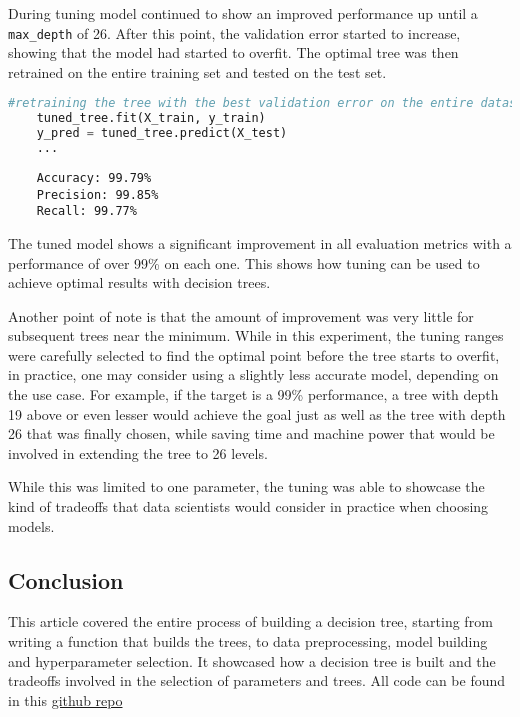 \documentclass{article}
\begin{document}
During tuning model continued to show an improved performance up until a \texttt{max\_depth} of 26. After this point, the validation error started to increase, showing that the model had started to overfit. The optimal tree was then retrained on the entire training set and tested on the test set.
\begin{lstlisting}[language=Python, caption=Retraining the best tree, label=code:hyperparameter_tuning]
    #retraining the tree with the best validation error on the entire dataset
    tuned_tree.fit(X_train, y_train)
    y_pred = tuned_tree.predict(X_test)
    ...
\end{lstlisting}

\begin{lstlisting}
    Accuracy: 99.79%
    Precision: 99.85%
    Recall: 99.77%
\end{lstlisting}

The tuned model shows a significant improvement in all evaluation metrics with a performance of over 99\% on each one. This shows how tuning can be used to achieve optimal results with decision trees. 

Another point of note is that the amount of improvement was very little for subsequent trees near the minimum. While in this experiment, the tuning ranges were carefully selected to find the optimal point before the tree starts to overfit, in practice, one may consider using a slightly less accurate model, depending on the use case. For example, if the target is a 99\% performance, a tree with depth 19 above or even lesser would achieve the goal just as well as the tree with depth 26 that was finally chosen, while saving time and machine power that would be involved in extending the tree to 26 levels.

While this was limited to one parameter, the tuning was able to showcase the kind of tradeoffs that data scientists would consider in practice when choosing models.

\subsection{Conclusion}

This article covered the entire process of building a decision tree, starting from writing a function that builds the trees, to data preprocessing, model building and hyperparameter selection. It showcased how a decision tree is built and the tradeoffs involved in the selection of parameters and trees.
All code can be found in this \href{https://github.com/Mubarakbabs/unimi-dse-ml-final-project/}{github repo}



\end{document}
